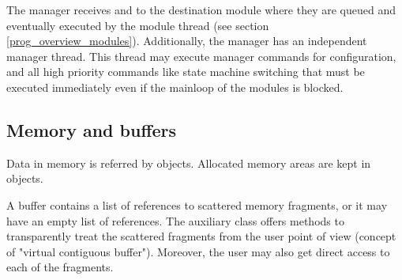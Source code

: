 The manager receives and  
to the destination module where they are queued and eventually executed 
by the module thread (see section \ref{prog_overview_modules}).
Additionally, the manager has an independent manager thread. 
This thread may execute manager commands for configuration, 
and all high priority commands like state machine switching 
that must be executed immediately even if the mainloop of the modules is blocked.
 
 

\subsection{Memory and buffers}
Data in memory is referred by  objects. 
Allocated memory areas are kept in  objects. 
   

A buffer contains a list of references to scattered memory 
fragments, or it may have an empty list of references. 
The auxiliary class  offers methods to transparently 
treat the scattered fragments from the user point of view 
(concept of "virtual contiguous buffer"). 
Moreover, the user may also get direct access to each of the fragments.      

